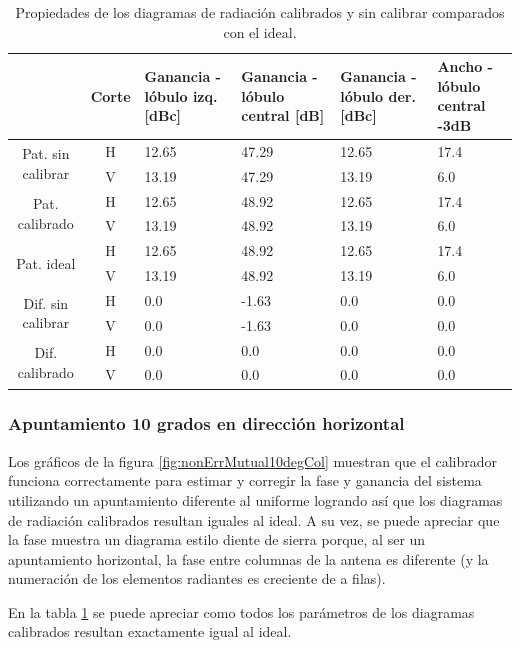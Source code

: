 \begin{table}[H]
  \footnotesize
  \centering
  \begin{tabular}{|c|c|p{2cm}|p{2.5cm}|p{2.5cm}|p{2.5cm}|}
    \cline{2-6}
    \multicolumn{1}{c|}{} & Corte & Ganancia - lóbulo izq. [dBc] & Ganancia - lóbulo central [dB] &
    Ganancia - lóbulo der. [dBc] & Ancho - lóbulo central -3dB \tabularnewline\hline
    \multirow{2}{2cm}{Pat. sin calibrar} & H & 12.65 & 47.29 & 12.65 & 17.4 \tabularnewline\cline{2-6}
     & V & 13.19 & 47.29 & 13.19 & 6.0 \tabularnewline\hline
    \multirow{2}{2cm}{Pat. calibrado} & H & 12.65 & 48.92 & 12.65 & 17.4 \tabularnewline\cline{2-6}
     & V & 13.19 & 48.92 & 13.19 & 6.0 \tabularnewline\hline
    \multirow{2}{2cm}{Pat. ideal} & H & 12.65 & 48.92 & 12.65 & 17.4 \tabularnewline\cline{2-6}
     & V & 13.19 & 48.92 & 13.19 & 6.0 \tabularnewline\hline
    \multirow{2}{2cm}{Dif. sin calibrar} & H & 0.0 & -1.63 & 0.0 & 0.0\tabularnewline\cline{2-6}
     & V & 0.0 & -1.63 & 0.0 & 0.0 \tabularnewline\hline
    \multirow{2}{2cm}{Dif. calibrado} & H & 0.0 & 0.0 & 0.0 & 0.0 \tabularnewline\cline{2-6}
     & V & 0.0 & 0.0 & 0.0 & 0.0 \tabularnewline\hline
  \end{tabular}
  \caption{Propiedades de los diagramas de radiación calibrados y sin calibrar comparados con el ideal.}
  \label{tab:nonErrMutual0deg}
\end{table}


\subsubsection{Apuntamiento 10 grados en dirección horizontal}

Los gráficos de la figura \ref{fig:nonErrMutual10degCol} muestran que el calibrador funciona correctamente para estimar y 
corregir la fase y ganancia del sistema utilizando un apuntamiento diferente al uniforme logrando así que los diagramas de 
radiación calibrados resultan iguales al ideal. A su vez, se puede apreciar que la fase muestra un diagrama estilo diente 
de sierra porque, al ser un apuntamiento horizontal, la fase entre columnas de la antena es diferente (y la numeración de 
los elementos radiantes es creciente de a filas).

En la tabla \ref{tab:nonErrMutual0deg} se puede apreciar como todos los parámetros de los diagramas calibrados resultan 
exactamente igual al ideal.


